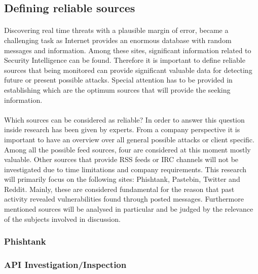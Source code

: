 \documentclass[12pt]{article}
\begin{document}
\subsection{Defining reliable sources}
\parbox{\linewidth}{
\paragraph{}
Discovering real time threats with a plausible margin of error, became a challenging task as Internet provides an enormous database with random messages and information. Among these sites, significant information related to Security Intelligence can be found. Therefore it is important to define reliable sources that being monitored can provide significant valuable data for detecting future or present possible attacks. Special attention has to be provided in establishing which are the optimum sources that will provide the seeking information. 
\paragraph{}
Which sources can be considered as reliable? In order to answer this question inside research has been given by experts. From a company perspective it is important to have an overview over all general possible attacks or client specific. Among all the possible feed sources, four are considered at this moment mostly valuable. Other sources that provide RSS feeds or IRC channels will not be investigated due to time limitations and company requirements. This research will primarily focus on the following sites: Phishtank, Pastebin, Twitter and Reddit. Mainly, these are considered fundamental for the reason that past activity revealed vulnerabilities found through posted messages.  Furthermore mentioned sources will be analysed in particular and be judged by the relevance of the subjects involved in discussion. 
}
   

\subsubsection*{Phishtank}
\subsubsection{API Investigation/Inspection}
\end{document}
